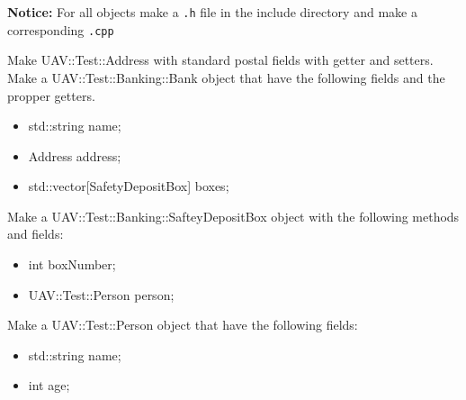\documentclass[10pt]{exam}
\begin{document}
\newpage

\textbf{Notice:} For all objects make a \lstinline{.h} file in the include directory and make a corresponding \lstinline{.cpp}
\begin{questions}
\question Make UAV::Test::Address with standard postal fields with getter and setters.
\question Make a UAV::Test::Banking::Bank object that have the following fields and the propper getters.
\begin{itemize}
\item std::string name;
\item Address address;
\item std::vector[SafetyDepositBox] boxes;
\end{itemize}

\question Make a UAV::Test::Banking::SafteyDepositBox object with the following methods and fields:
\begin{itemize}
\item int boxNumber;
\item UAV::Test::Person person;
\end{itemize}

\question Make a UAV::Test::Person object that have the following fields:
\begin{itemize}
\item std::string name;
\item int age;
\end{itemize}
\end{questions}
\end{document}
